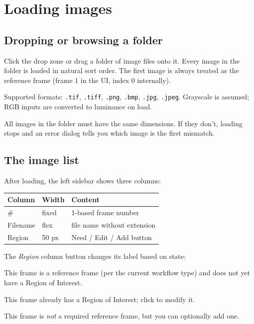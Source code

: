 \section{Loading images}
\label{sec:loading-images}

\subsection{Dropping or browsing a folder}

Click the drop zone or drag a folder of image files onto it. Every
image in the folder is loaded in natural sort order. The first image
is always treated as the reference frame (frame 1 in the UI,
index 0 internally).

Supported formats: \texttt{.tif}, \texttt{.tiff}, \texttt{.png},
\texttt{.bmp}, \texttt{.jpg}, \texttt{.jpeg}. Grayscale is assumed;
RGB inputs are converted to luminance on load.

\begin{warnbox}
All images in the folder must have the same dimensions. If they
don't, loading stops and an error dialog tells you which image is
the first mismatch.
\end{warnbox}

\subsection{The image list}

After loading, the left sidebar shows three columns:

\begin{center}
\begin{tabular}{lll}
  \toprule
  Column & Width & Content \\
  \midrule
  \# & fixed & 1-based frame number \\
  Filename & flex & file name without extension \\
  Region & 50 px & Need / Edit / Add button \\
  \bottomrule
\end{tabular}
\end{center}

The \emph{Region} column button changes its label based on state:

\begin{description}[leftmargin=1.2cm,style=nextline]
  \item[\textcolor{aldicred}{\textbf{Need}}]
    This frame is a reference frame (per the current workflow type)
    and does not yet have a Region of Interest.
  \item[\textcolor{aldicgreen}{\textbf{Edit}}]
    This frame already has a Region of Interest; click to modify it.
  \item[Add]
    This frame is \emph{not} a required reference frame, but you can
    optionally add one.
\end{description}

